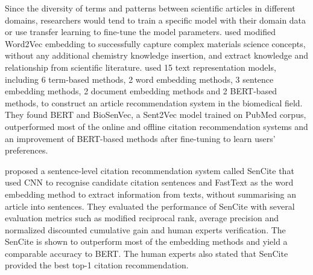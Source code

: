 Since the diversity of terms and patterns between scientific articles in different domains, researchers would tend to train a specific model with their domain data or use transfer learning to fine-tune the model parameters.
\cite{tshitoyan2019} used modified Word2Vec embedding to successfully capture complex materials science concepts, without any additional chemistry knowledge insertion, and extract knowledge and relationship from scientific literature.
\cite{zhang2022} used 15 text representation models, including 6 term-based methods, 2 word embedding methods, 3 sentence embedding methods, 2 document embedding methods and 2 BERT-based methods, to construct an article recommendation system in the biomedical field.
They found BERT and BioSenVec, a Sent2Vec model trained on PubMed corpus, outperformed most of the online and offline citation recommendation systems and an improvement of BERT-based methods after fine-tuning to learn users' preferences.

\cite{wang2022} proposed a sentence-level citation recommendation system called SenCite that used CNN to recognise candidate citation sentences and FastText as the word embedding method to extract information from texts, without summarising an article into sentences.
They evaluated the performance of SenCite with several evaluation metrics such as modified reciprocal rank, average precision and normalized discounted cumulative gain and human experts verification.
The SenCite is shown to outperform most of the embedding methods and yield a comparable accuracy to BERT.
The human experts also stated that SenCite provided the best top-1 citation recommendation.